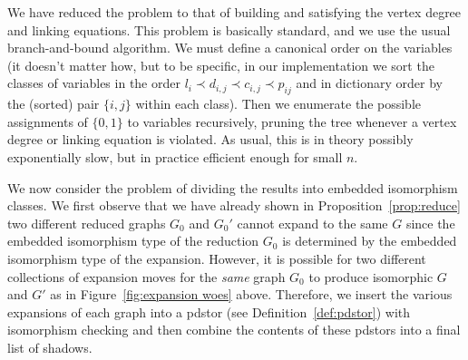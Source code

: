 \documentclass[amsmath,secnumarabic,amssymb,floatfix,nofootinbib,nobibnotes,letterpaper,11pt,tightenlines,showkeys]{revtex4}
\theoremstyle{definition}
\begin{document}
We have reduced the problem to that of building and satisfying the vertex degree and linking equations. This problem is basically standard, and we use the usual branch-and-bound algorithm. We must define a canonical order on the variables (it doesn't matter how, but to be specific, in our implementation we sort the classes of variables in the order $l_i \prec d_{i,j} \prec c_{i,j} \prec p_{ij}$ and in dictionary order by the (sorted) pair $\{i,j\}$ within each class). Then we enumerate the possible assignments of $\{0,1\}$ to variables recursively, pruning the tree whenever a vertex degree or linking equation is violated. As usual, this is in theory possibly exponentially slow, but in practice efficient enough for small $n$.

We now consider the problem of dividing the results into embedded isomorphism classes. We first observe that we have already shown in Proposition~\ref{prop:reduce} two different reduced graphs $G_0$ and $G_0'$ cannot expand to the same $G$ since the embedded isomorphism type of the reduction $G_0$ is determined by the embedded isomorphism type of the expansion. However, it is possible for two different collections of expansion moves for the \emph{same} graph $G_0$ to produce isomorphic $G$ and $G'$ as in Figure~\ref{fig:expansion woes} above. Therefore, we insert the various expansions of each graph into a pdstor (see Definition~\ref{def:pdstor}) with isomorphism checking and then combine the contents of these pdstors into a final list of shadows.
\end{document}
